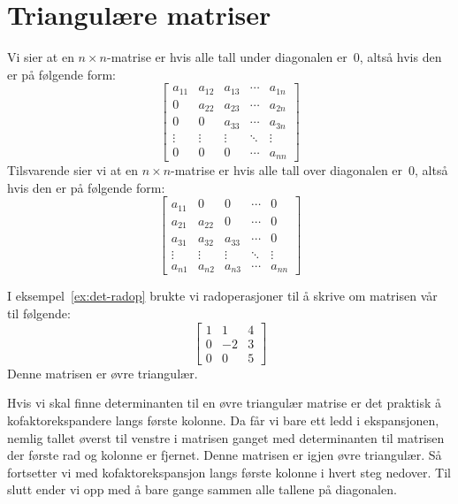 \section*{Triangulære matriser}

Vi sier at en $n \times n$-matrise er  hvis
alle tall under diagonalen er~$0$, altså hvis den er på følgende form:
\[
\begin{bmatrix}
a_{11} & a_{12} & a_{13} & \cdots & a_{1n} \\
0      & a_{22} & a_{23} & \cdots & a_{2n} \\
0      & 0      & a_{33} & \cdots & a_{3n} \\
\vdots & \vdots & \vdots & \ddots & \vdots \\
0      & 0      & 0      & \cdots & a_{nn}
\end{bmatrix}
\]
Tilsvarende sier vi at en $n \times n$-matrise er  hvis alle tall over diagonalen er~$0$, altså hvis den
er på følgende form:
\[
\begin{bmatrix}
a_{11} & 0      & 0      & \cdots & 0      \\
a_{21} & a_{22} & 0      & \cdots & 0      \\
a_{31} & a_{32} & a_{33} & \cdots & 0      \\
\vdots & \vdots & \vdots & \ddots & \vdots \\
a_{n1} & a_{n2} & a_{n3} & \cdots & a_{nn}
\end{bmatrix}
\]

\begin{ex}
I eksempel~\ref{ex:det-radop} brukte vi radoperasjoner til å skrive om
matrisen vår til følgende:
\[
\begin{bmatrix}
1 &  1 &  4 \\
0 & -2 &  3 \\
0 &  0 &  5
\end{bmatrix}
\]
Denne matrisen er øvre triangulær.
\end{ex}

Hvis vi skal finne determinanten til en øvre triangulær matrise er det
praktisk å kofaktorekspandere langs første kolonne.  Da får vi bare
ett ledd i ekspansjonen, nemlig tallet øverst til venstre i matrisen
ganget med determinanten til matrisen der første rad og kolonne er
fjernet.  Denne matrisen er igjen øvre triangulær.  Så fortsetter vi
med kofaktorekspansjon langs første kolonne i hvert steg nedover.  Til
slutt ender vi opp med å bare gange sammen alle tallene på diagonalen.

